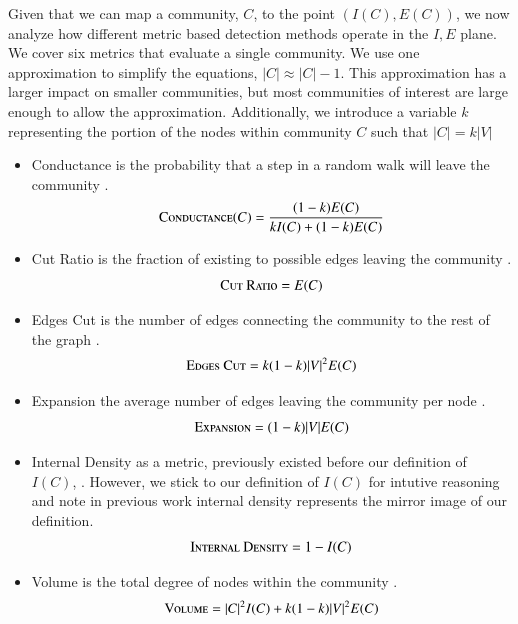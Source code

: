 \documentclass[phd,tocprelim]{cornell}
\begin{document}
Given that we can map a community, $C$, to the point $(I(C), E(C))$, we now analyze how different metric based detection methods operate in the $I,E$ plane.  We cover six metrics that evaluate a single community.  We use one approximation to simplify the equations, $|C| \approx |C| - 1$.  This approximation has a larger impact on smaller communities, but most communities of interest are large enough to allow the approximation.  Additionally, we introduce a variable $k$ representing the portion of the nodes within community $C$ such that $|C| = k |V|$
\begin{itemize}
\item {\sc Conductance} is the probability that a step in a random walk will leave the community \cite{JTODO}.
\begin{equation}
\mbox{\sc Conductance}(C) = \frac{(1 - k)E(C)}{kI(C) + (1 - k)E(C)}
\end{equation}
\item {\sc Cut Ratio} is the fraction of existing to possible edges leaving the community \cite{JTODO}.
\begin{equation}
\mbox{\sc Cut Ratio} = E(C)
\end{equation}
\item {\sc Edges Cut} is the number of edges connecting the community to the rest of the graph \cite{JTODO}.\begin{equation}
\mbox{\sc Edges Cut} = k (1-k) |V|^2 E(C)
\end{equation}
\item {\sc Expansion} the average number of edges leaving the community per node \cite{JTODO}.
\begin{equation}
\mbox{\sc Expansion} = (1 - k)|V |E(C)
\end{equation}
\item {\sc Internal Density} as a metric, previously existed before our definition of $I(C)$, \cite{JTODO}.  However, we stick to our definition of $I(C)$ for intutive reasoning and note in previous work internal density represents the mirror image of our definition.
\begin{equation}
\mbox{\sc Internal Density} = 1 - I(C)
\end{equation}
\item {\sc Volume} is the total degree of nodes within the community \cite{JTODO}.
\begin{equation}
\mbox{\sc Volume} = |C|^2 I(C) + k(1-k)|V|^2E(C)
\end{equation}
\end{itemize}
\end{document}
